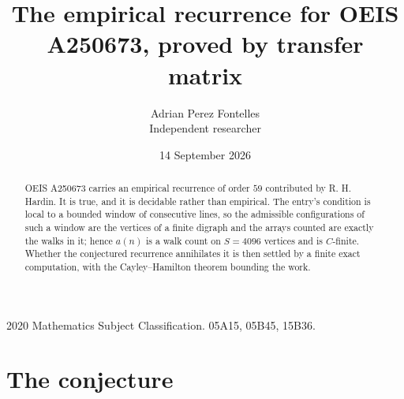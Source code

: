\documentclass[11pt,a4paper]{article}
\title{The empirical recurrence for OEIS A250673, proved by transfer matrix}
\author{Adrian Perez Fontelles\\ \small Independent researcher}
\date{14 September 2026}
\theoremstyle{plain}
\theoremstyle{definition}
\begin{document}
\maketitle

\begin{abstract}
OEIS A250673 carries an empirical recurrence of order $59$ contributed by R. H. Hardin. It is
true, and it is decidable rather than empirical. The entry's condition is local to a bounded window of consecutive lines, so
the admissible configurations of such a window are the vertices of a finite digraph and the
arrays counted are exactly the walks in it; hence $a(n)$ is a walk count on $S=4096$ vertices
and is $C$-finite. Whether the conjectured recurrence annihilates it is then settled by a
finite exact computation, with the Cayley--Hamilton theorem bounding the work.
\end{abstract}

\noindent\small 2020 Mathematics Subject Classification. 05A15, 05B45, 15B36.\normalsize

\section{The conjecture}
\end{document}
